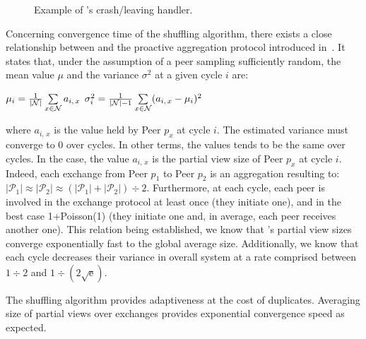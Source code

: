 \begin{figure*}
  \centering
  \hspace{10pt}
  \hspace{10pt}
  \caption{\label{fig:crashexample}Example of \SPRAY's crash/leaving
    handler. }
\end{figure*}

Concerning convergence time of the shuffling algorithm, there exists a close
relationship between \SPRAY and the proactive aggregation protocol introduced
in~\cite{jelasity2004epidemic,montresor2004robust}. It states that, under the
assumption of a peer sampling sufficiently random, the mean value $\mu$ and the
variance $\sigma^2$ at a given cycle $i$ are:
\begin{center}
  $\mu_i = {1\over{|\mathcal{N}|}} \sum\limits_{x \in \mathcal{N}} a_{i,\,x}$
  \hfill
  $\sigma^2_i = {1\over{|\mathcal{N}|-1}}\sum\limits_{x \in \mathcal{N}}
  (a_{i,\,x} - \mu_i)^2$
\end{center}
where $a_{i,\,x}$ is the value held by Peer $p_x$ at cycle $i$. The estimated
variance must converge to $0$ over cycles. In other terms, the values tends to
be the same over cycles. In the \SPRAY case, the value $a_{i,\,x}$ is the
partial view size of Peer $p_x$ at cycle $i$. Indeed, each exchange from Peer
$p_1$ to Peer $p_2$ is an aggregation resulting to:
$|\mathcal{P}_1|\approx|\mathcal{P}_2|\approx{(|\mathcal{P}_1| +
  |\mathcal{P}_2|) \div 2}$.
Furthermore, at each cycle, each peer is involved in the exchange protocol at
least once (they initiate one), and in the best case 1+Poisson(1) (they
initiate one and, in average, each peer receives another one). This relation
being established, we know that \SPRAY's partial view sizes converge
exponentially fast to the global average size. Additionally, we know that each
cycle decreases their variance in overall system at a rate comprised between
${1\div 2}$ and $1\div ({2\sqrt{\text{e}}})$.

The shuffling algorithm provides adaptiveness at the cost of
duplicates. Averaging size of partial views over exchanges provides exponential
convergence speed as expected.

